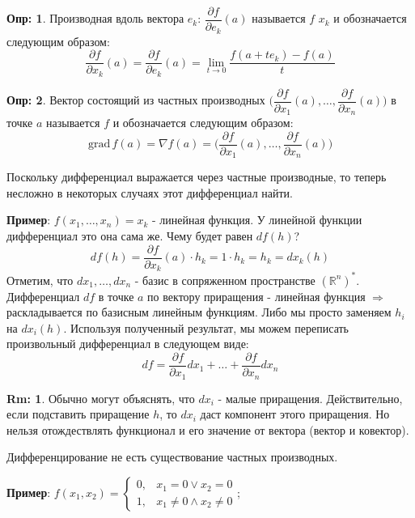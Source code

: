 \documentclass[12pt]{article}
\newcommand{\MR}{\mathbb{R}}
\theoremstyle{definition}
\newtheorem{defn}{Опр:}
\newtheorem{rem}{Rm:}
\begin{document}
\begin{defn}
	Производная вдоль вектора $e_k$: $\dfrac{\partial f}{\partial e_k}(a)$ называется  $f$  $x_k$  и обозначается следующим образом: 
	$$
	\dfrac{\partial f}{\partial x_k}(a) = \dfrac{\partial f}{\partial e_k}(a) = \lim\limits_{t \to 0} \dfrac{f(a + te_k) - f(a)}{t}
	$$
\end{defn}
\begin{defn}
	Вектор состоящий из частных производных $\Big(\dfrac{\partial f}{\partial x_1}(a), \dotsc, \dfrac{\partial f}{\partial x_n}(a)\Big)$ в точке $a$ называется  $f$ и обозначается следующим образом: 
	$$
	\text{grad}\, f(a) = \nabla f(a) = \Big(\dfrac{\partial f}{\partial x_1}(a), \dotsc, \dfrac{\partial f}{\partial x_n}(a)\Big)
	$$
\end{defn}

Поскольку дифференциал выражается через частные производные, то теперь несложно в некоторых случаях этот дифференциал найти.

\textbf{Пример}: $f(x_1,\dotsc,x_n) = x_k$ - линейная функция. У линейной функции дифференциал это она сама же. Чему будет равен $df(h)$? 
$$
	df(h) = \dfrac{\partial f}{\partial x_k}(a){\cdot}h_k = 1{\cdot}h_k = h_k = dx_k(h)
$$ 
Отметим, что $dx_1, \dotsc, dx_n$ - базис в сопряженном пространстве $(\MR^n)^*$. Дифференциал $df$ в точке $a$ по вектору приращения - линейная функция $\Rightarrow$ раскладывается по базисным линейным функциям. Либо мы просто заменяем $h_i$ на $dx_i(h)$. Используя полученный результат, мы можем переписать произвольный дифференциал в следующем виде:
$$
	df =  \dfrac{\partial f}{\partial x_1}dx_1 + \dotsc + \dfrac{\partial f}{\partial x_n}dx_n
$$
\begin{rem}
	Обычно могут объяснять, что $dx_i$ - малые приращения. Действительно, если подставить приращение $h$, то $dx_i$ даст компонент этого приращения. Но нельзя отождествлять функционал и его значение от вектора (вектор и ковектор).
\end{rem}

Дифференцирование не есть существование частных производных.

\textbf{Пример}: $f(x_1,x_2) = \begin{cases}
	0, & x_1 = 0 \vee x_2 = 0 \\
	1, & x_1 \neq 0 \wedge x_2 \neq 0
\end{cases}$;
\end{document}
